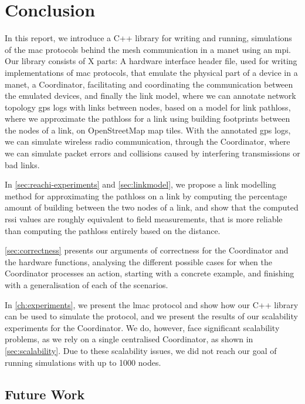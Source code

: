 \chapter{Conclusion}\label{ch:conclusion}
In this report, we introduce a C++ library for writing and running, simulations of the \gls{mac} protocols
behind the mesh communication in a \gls{manet} using an \gls{mpi}. Our library consists of X parts: A hardware
interface header file, used for writing implementations of \gls{mac} protocols, that emulate the physical part
of a device in a \gls{manet}, a Coordinator, facilitating and coordinating the communication between the
emulated devices, and finally the link model, where we can annotate network topology \gls{gps} logs with links
between nodes, based on a model for link \gls{pathloss}, where we approximate the \gls{pathloss} for a link
using building footprints between the nodes of a link, on OpenStreetMap map tiles. With the annotated
\gls{gps} logs, we can simulate wireless radio communication, through the Coordinator, where we can
simulate packet errors and collisions caused by interfering transmissions or bad links. \smallbreak

In \autoref{sec:reachi-experiments} and \autoref{sec:linkmodel}, we propose a link modelling method for
approximating the \gls{pathloss} on a link by computing the percentage amount of building between the two
nodes of a link, and show that the computed \gls{rssi} values are roughly equivalent to field measurements,
that is more reliable than computing the \gls{pathloss} entirely based on the distance. \smallbreak

\autoref{sec:correctness} presents our arguments of correctness for the Coordinator and the hardware
functions, analysing the different possible cases for when the Coordinator processes an action, starting with 
a concrete example, and finishing with a generalisation of each of the scenarios. \smallbreak

In \autoref{ch:experiments}, we present the \gls{lmac} protocol and show how our C++ library can be used to
simulate the protocol, and we present the results of our scalability experiments for the Coordinator. We do,
however, face significant scalability problems, as we rely on a single centralised Coordinator, as shown in
\autoref{sec:scalability}. Due to these scalability issues, we did not reach our goal of running simulations
with up to 1000 nodes.


\section{Future Work}

